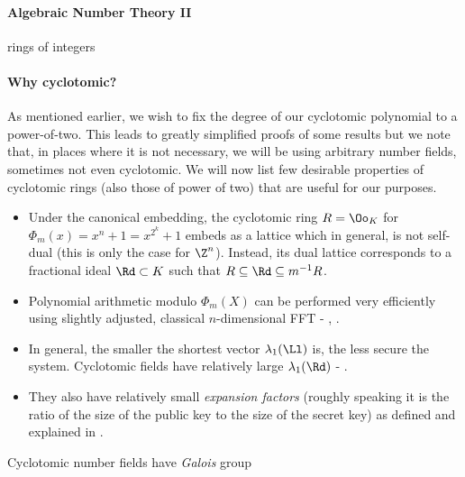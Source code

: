 \paragraph{Algebraic Number Theory II}
\begin{definition}[Trace]
\end{definition}
\begin{definition}[Norm]
\end{definition}
rings of integers
\begin{definition}
\end{definition}
\begin{definition}
\end{definition}
\begin{definition}[Dual]
\end{definition}

\paragraph{Why cyclotomic?}\label{why?}
As mentioned earlier, we wish to fix the degree of our cyclotomic polynomial to a power-of-two. This leads to greatly simplified proofs of some results but we note that, in places where it is not necessary, we will be using arbitrary number fields, sometimes not even cyclotomic. We will now list few desirable properties of cyclotomic rings (also those of power of two) that are useful for our purposes.
\begin{itemize}
	\item Under the canonical embedding, the cyclotomic ring $R = \Oo_K$ for $\Phi_m(x) = x^n + 1 = x^{2^k} + 1$ embeds as a lattice which in general, is not self-dual (this is only the case for $\Z^n$). Instead, its dual lattice corresponds to a fractional ideal $\Rd \subset K$ such that $R \subseteq \Rd \subseteq m^{-1}R$.
	\item Polynomial arithmetic modulo $\Phi_m(X)$ can be performed very efficiently using slightly adjusted, classical $n$-dimensional FFT - \cite{toolkit}, \cite{swift}.
	\item In general, the smaller the shortest vector $\lambda_1(\Ll)$ is, the less secure the system. Cyclotomic fields have relatively large $\lambda_1(\Rd)$ - \cite{oracle}.
	\item They also have relatively small \textit{expansion factors} (roughly speaking it is the ratio of the size of the public key to the size of the secret key) as defined and explained in \cite{expansion}.
\end{itemize}
Cyclotomic number fields have \textit{Galois} group
